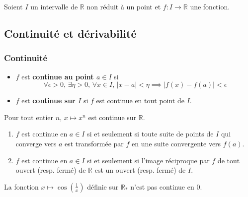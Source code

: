 



  Soient $I$ un intervalle de $\mathbb{R}$ non réduit à un point et $f : I \rightarrow \mathbb{R}$ une fonction.

  \subsection{Continuité et dérivabilité}

  \subsubsection{Continuité}


  \begin{definition}
    \begin{itemize}
      \item $f$ est \textbf{continue au point $a \in I$} si
      \[ \forall \epsilon > 0, \, \exists \eta > 0, \, \forall x \in I, \, \vert x - a \vert < \eta \implies \vert f(x) - f(a) \vert < \epsilon \]
      \item $f$ est \textbf{continue sur $I$} si $f$ est continue en tout point de $I$.
    \end{itemize}
  \end{definition}

  \begin{example}
    Pour tout entier $n$, $x \mapsto x^n$ est continue sur $\mathbb{R}$.
  \end{example}

  \begin{theorem}
    \begin{enumerate}[label=(\roman*)]
      \item $f$ est continue en $a \in I$ si et seulement si toute suite de points de $I$ qui converge vers $a$ est transformée par $f$ en une suite convergente vers $f(a)$.
      \item $f$ est continue en $a \in I$ si et seulement si l'image réciproque par $f$ de tout ouvert (resp. fermé) de $\mathbb{R}$ est un ouvert (resp. fermé) de $I$.
    \end{enumerate}
  \end{theorem}

  \begin{example}
    La fonction $x \mapsto \cos \left( \frac{1}{x} \right)$ définie sur $\mathbb{R}_*$ n'est pas continue en $0$.
  \end{example}

